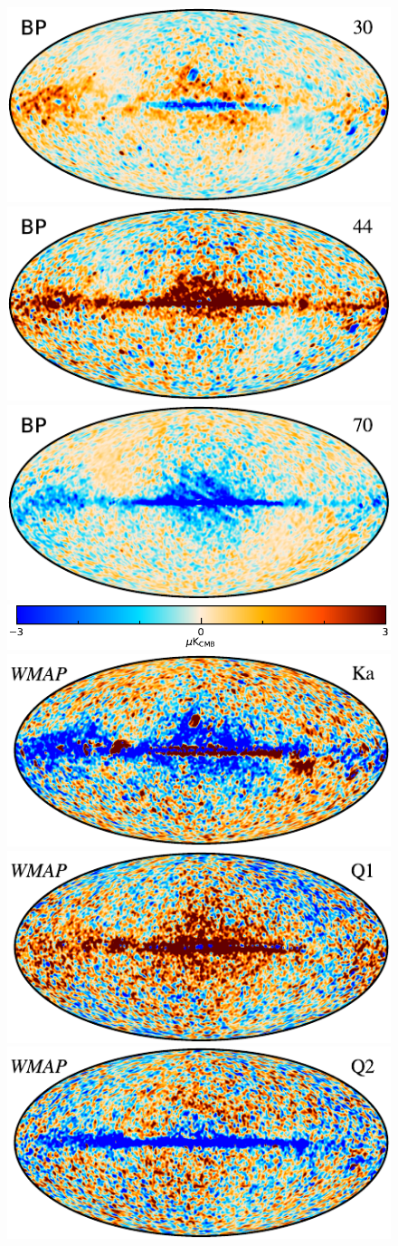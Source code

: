 \documentclass{aa}
\begin{document}
\begin{figure}
  \center       
  \includegraphics[width=0.32\linewidth]{figs/res_030_mean_f2g_120arcmin_T_w8_c-planck.pdf}
  \includegraphics[width=0.32\linewidth]{figs/res_044_mean_f2g_120arcmin_T_w8_c-planck.pdf}
  \includegraphics[width=0.32\linewidth]{figs/res_070_mean_f2g_120arcmin_T_w8_c-planck.pdf}\\
  \includegraphics[width=0.7\linewidth]{figs/colorbar_range3_w18_uKcmb_c-planck.pdf}\vspace{0.3cm}\\
  \includegraphics[width=0.32\linewidth]{figs/res_030-WMAP_Ka_mean_f2g_120arcmin_T_w8_c-planck.pdf}
  \includegraphics[width=0.32\linewidth]{figs/res_040-WMAP_Q1_mean_f2g_120arcmin_T_w8_c-planck.pdf}
  \includegraphics[width=0.32\linewidth]{figs/res_040-WMAP_Q2_mean_f2g_120arcmin_T_w8_c-planck.pdf}\\

\end{figure}
\end{document}

